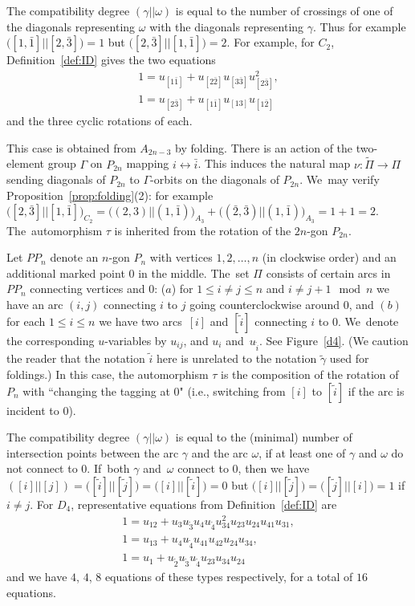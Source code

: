 \documentclass[10pt,a4paper]{amsart}
\def\tgamma{{\tilde \gamma}}
\numberwithin{equation}{section}
\begin{document}
The compatibility degree $(\gamma||\omega)$ is equal to the number of crossings of one of the diagonals representing $\omega$ with the diagonals representing $\gamma$. Thus for example $\big([1, \bar 1]||[2, \bar 3]\big) =1$ but $\big([2,\bar 3] || [1,\bar 1]\big) = 2$. For example, for $C_2$, Definition~\ref{def:ID} gives the two equations
\begin{gather}
1 = u_{[1 \bar 1]} + u_{[2 \bar 2]} u_{[3 \bar 3]} u_{[2 \bar 3]}^2,\nonumber
\\
1 = u_{[2 \bar 3]} + u_{[1 \bar 1]} u_{[13]} u_{[1 \bar 2]}\label{eq:C2}
\end{gather}
and the three cyclic rotations of each.

This case is obtained from $A_{2n-3}$ by folding. There is an action of the two-element group $\Gamma$ on $P_{2n}$ mapping $i \leftrightarrow \bar i$. This induces the natural map $\nu\colon \tilde \Pi \to \Pi$ sending diagonals of $P_{2n}$ to $\Gamma$-orbits on the diagonals of $P_{2n}$. We~may verify Proposition~\ref{prop:folding}(2): for example $\big([2,\bar 3]||[1, \bar 1]\big)_{C_2} = \big((2,3)||(1,\bar 1)\big)_{A_3} + \big((\bar 2, \bar 3)||(1,\bar 1)\big)_{A_3} = 1+ 1 = 2$. The~automorphism $\tau$ is inherited from the rotation of the $2n$-gon $P_{2n}$.

\medskip{} %
Let $PP_n$ denote an $n$-gon $P_n$ with vertices $1,2,\dots,n$ (in clockwise order) and an additional marked point $0$ in the middle. The~set $\Pi$ consists of certain arcs in $PP_n$ connecting vertices and $0$: ($a$) for $1 \leq i \neq j \leq n$ and $i \neq j+1 \mod n$ we have an arc $(i,j)$ connecting $i$ to $j$ going counterclockwise around $0$, and $(b)$ for each $1\leq i \leq n$ we have two arcs~$[i]$ and $[\tilde i]$ connecting $i$ to $0$. We~denote the corresponding $u$-variables by $u_{ij}$, and $u_i$ and~$u_{\tilde i}$. See Figure~\ref{d4}. (We caution the reader that the notation $\tilde i$ here is unrelated to the notation $\tgamma$ used for foldings.) In this case, the automorphism $\tau$ is the composition of the rotation of $P_n$ with ``changing the tagging at 0" (i.e., switching from $[i]$ to $[\tilde i]$ if the arc is incident to $0$).

The compatibility degree $(\gamma || \omega)$ is equal to the (minimal) number of intersection points bet\-ween the arc $\gamma$ and the arc $\omega$, if at least one of $\gamma$ and $\omega$ do not connect to $0$. If~both $\gamma$ and~$\omega$ connect to $0$, then we have $([i] || [j]) = \big([\tilde i] || [\tilde j]\big) = \big([i] || [\tilde i]\big) = 0$ but $\big([i] || [\tilde j]\big) = \big([\tilde j] || [i]\big) = 1$ if $i \neq j$. For $D_4$, representative equations from Definition~\ref{def:ID} are
\begin{gather}
1 = u_{12} + u_3 u_{\tilde3} u_4 u_{\tilde 4} u_{34}^2 u_{23} u_{24} u_{41} u_{31},\nonumber
\\
1 =u_{13} + u_4u_{\tilde 4} u_{41}u_{42} u_{24} u_{34},\nonumber
\\
1 = u_1+ u_{\tilde 2} u_{\tilde 3} u_{\tilde 4} u_{23} u_{34} u_{24}
\label{eq:D4}
\end{gather}
and we have $4$, $4$, $8$ equations of these types respectively, for a total of $16$ equations.
\end{document}
